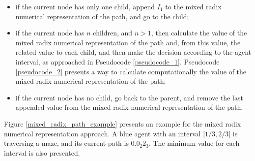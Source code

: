 \begin{itemize}
\item if the current node has only one child, append $I_{1}$ to the mixed radix numerical representation of the path, and go to the child;

\item if the current node has $n$ children, and $n > 1$, then calculate the value of the mixed radix numerical representation of the path and, from this value, the related value to each child, and then make the decision according to the agent interval, as approached in Pseudocode \ref{pseudocode_1}. Pseudocode \ref{pseudocode_2} presents a way to calculate computationally the value of the mixed radix numerical representation of the path;

\item if the current node has no child, go back to the parent, and remove the last appended value from the mixed radix numerical representation of the path.
\end{itemize}

Figure \ref{mixed_radix_path_example} presents an example for the mixed radix numerical representation approach. A blue agent with an interval $[1/3,2/3[$ is traversing a maze, and its current path is $0.0_{2}2_{3}$. The minimum value for each interval is also presented.

